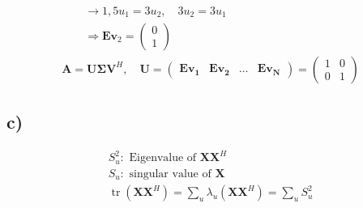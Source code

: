 \documentclass[fleqn]{article}
\DeclareMathOperator{\tr}{tr}
\begin{document}
\begin{align*}
	&\qquad\rightarrow 1,5u_{1}=3u_{2},\quad 3u_{2}=3u_{1}& \\
	&\qquad\Rightarrow\mathbf{Ev}_{2}=\begin{pmatrix}0\\1\end{pmatrix}& \\
	&\mathbf{A=U\Sigma V}^{H},\quad\mathbf{U}=\begin{pmatrix}\mathbf{Ev_{1}} & \mathbf{Ev_{2}} & \ldots & \mathbf{Ev_{N}}\end{pmatrix}=
	\begin{pmatrix}
	1 & 0 \\
	0 & 1
	\end{pmatrix}&
\end{align*}

\subsection*{c)}
\begin{align*}
	&S_{u}^{2}:\text{ Eigenvalue of }\mathbf{XX}^{H}& \\
	&S_{u}:\text{ singular value of }\mathbf{X}& \\
	&\tr\left(\mathbf{XX}^{H}\right)=\sum_{u}\lambda_{u}\left(\mathbf{XX}^{H}\right)=\sum_{u}S_{u}^{2}&
\end{align*}
\end{document}
